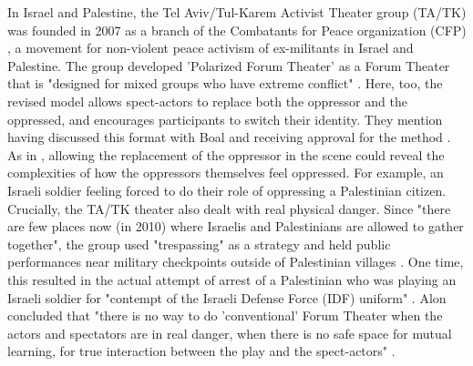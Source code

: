 \documentclass[dissertation,math,vertlayout,pdfa,colorlinks,nologo]{aaltoseries}
\begin{document}
In Israel and Palestine, the Tel Aviv/Tul-Karem Activist Theater group (TA/TK) was founded in 2007 as a branch of the Combatants for Peace organization (CFP) \cite{alonCHAPTERFOURTEENNonViolent2011}, a movement for non-violent peace activism of ex-militants in Israel and Palestine. The group developed 'Polarized Forum Theater' as a Forum Theater that is "designed for mixed groups who have extreme conflict" \cite[p. 167]{alonCHAPTERFOURTEENNonViolent2011}. Here, too, the revised model allows spect-actors to replace both the oppressor and the oppressed, and encourages participants to switch their identity. They mention having discussed this format with Boal and receiving approval for the method \cite[p. 167]{alonCHAPTERFOURTEENNonViolent2011}. As in \cite{miramontiForumTheatreReconciliation2025}, allowing the replacement of the oppressor in the scene could reveal the complexities of how the oppressors themselves feel oppressed. For example, an Israeli soldier feeling forced to do their role of oppressing a Palestinian citizen. Crucially, the TA/TK theater also dealt with real physical danger. Since "there are few places now (in 2010) where Israelis and Palestinians are allowed to gather together", the group used "trespassing" as a strategy and held public performances near military checkpoints outside of Palestinian villages \cite[p. 170]{alonCHAPTERFOURTEENNonViolent2011}. One time, this resulted in the actual attempt of arrest of a Palestinian who was playing an Israeli soldier for "contempt of the Israeli Defense Force (IDF) uniform" \cite[p. 171]{alonCHAPTERFOURTEENNonViolent2011}. Alon concluded that "there is no way to do 'conventional' Forum Theater when the actors and spectators are in real danger, when there is no safe space for mutual learning, for true interaction between the play and the spect-actors" \cite[p. 172]{alonCHAPTERFOURTEENNonViolent2011}.
\end{document}
